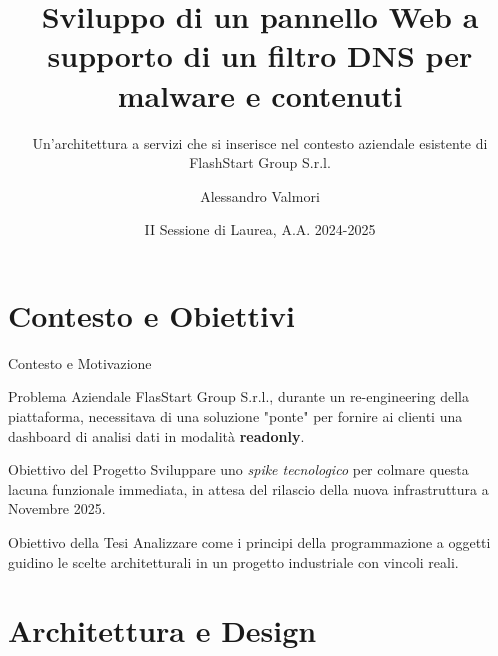 \documentclass[8pt]{beamer}
\title{Sviluppo di un pannello Web a supporto di un filtro DNS per malware e contenuti}
\subtitle{Un'architettura a servizi che si inserisce nel contesto aziendale esistente di FlashStart Group S.r.l.}
\date{II Sessione di Laurea, A.A. 2024-2025}
\author{Alessandro Valmori}
\institute{Università di Bologna \and Relatore: Prof. Mirko Viroli \and Correlatore: Dott. Nicolas Farabegoli}
\begin{document}
\maketitle



\section{Contesto e Obiettivi}

\begin{frame}{Contesto e Motivazione}
  \begin{block}{Problema Aziendale }
    FlasStart Group S.r.l., durante un re-engineering della piattaforma, necessitava di una soluzione "ponte" per fornire ai clienti una dashboard di analisi dati in modalità \textbf{readonly}.
  \end{block}
  \begin{block}{Obiettivo del Progetto }
    Sviluppare uno \textit{spike tecnologico} per colmare questa lacuna funzionale immediata, in attesa del rilascio della nuova infrastruttura a Novembre 2025.
  \end{block}
  \begin{alertblock}{Obiettivo della Tesi }
    Analizzare come i principi della programmazione a oggetti guidino le scelte architetturali in un progetto industriale con vincoli reali.
  \end{alertblock}
\end{frame}

\section{Architettura e Design}
\end{document}
